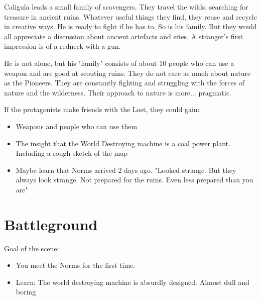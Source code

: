 \begin{npcBox}[title=Caligula]
    \begin{consequences}
    \item {}
    \item {}
    \item {}
    \end{consequences}

    \begin{npcDescription}
    Caligula leads a small family of scavengers. They travel the wilds, searching for treasure in ancient ruins. Whatever useful things they find, they reuse and recycle in creative ways.
    He is ready to fight if he has to. So is his family. But they would all appreciate a discussion about ancient artefacts and sites. A stranger's first impression is of a redneck with a gun.
    \end{npcDescription}

    \end{npcBox}

He is not alone, but his "family" consists of about 10 people who can use a weapon and are good at scouting ruins. They do not care as much about nature as the Pioneers. They are constantly fighting and struggling with the forces of nature and the wilderness. Their approach to nature is more... pragmatic.

If the protagonists make friends with the Lost, they could gain:

\begin{itemize}
    \item Weapons and people who can use them
    \item The insight that the World Destroying machine is a coal power plant. Including a rough sketch of the map
    \item Maybe learn that Norms arrived 2 days ago. "Looked strange. But they always look strange. Not prepared for the ruins. Even less prepared than you are"
\end{itemize}

\section{Battleground}

Goal of the scene:

\begin{itemize}
\item You meet the Norms for the first time.
\item Learn: The world destroying machine is absurdly designed. Almost dull and boring
\end{itemize}

